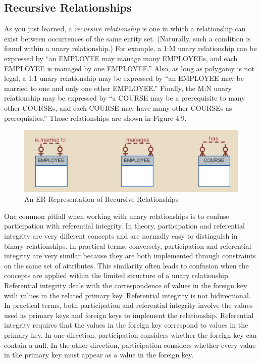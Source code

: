 \documentclass[a4paper, 12pt, titlepage]{report}
\begin{document}
{\subsection{Recursive Relationships}
As you just learned, a \emph{recursive relationship} is one in which a relationship can exist between occurrences of the same entity set. (Naturally, such a condition is found within a unary relationship.) For example, a 1:M unary relationship can be expressed by “an EMPLOYEE may manage many EMPLOYEEs, and each EMPLOYEE is managed by one EMPLOYEE.” Also, as long as polygamy is not legal, a 1:1 unary relationship may be expressed by “an EMPLOYEE may be married to one and only one other EMPLOYEE.” Finally, the M:N unary relationship may be expressed by “a COURSE may be a prerequisite to many other COURSEs, and each COURSE may have many other COURSEs as prerequisites.” Those relationships are shown in Figure 4.9.
\begin{figure}[H]
\centering
\includegraphics[scale=0.6]{Recur}
\caption{An ER Representation of Recursive Relationships}
\end{figure}
\noindent One common pitfall when working with unary relationships is to confuse participation with referential integrity. In theory, participation and referential integrity are very different concepts and are normally easy to distinguish in binary relationships. In practical terms, conversely, participation and referential integrity are very similar because they are both implemented through constraints on the same set of attributes. This similarity often leads to confusion when the concepts are applied within the limited structure of a unary relationship. Referential integrity deals with the correspondence of values in the foreign key with values in the related primary key. Referential integrity is not bidirectional. In practical terms, both participation and referential integrity involve the values used as primary keys and foreign keys to implement the relationship. Referential integrity requires that the values in the foreign key correspond to values in the primary key. In one direction, participation considers whether the foreign key can contain a null. In the other direction, participation considers whether every value in the primary key must appear as a value in the foreign key. 

}
\end{document}
